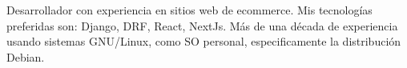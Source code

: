 


\begin{cvpubs}

  \cvpub
    {
      \begin{cvlist}
  \item {Desarrollador con experiencia en sitios web de ecommerce. Mis tecnologías preferidas son: Django, DRF, React, NextJs. Más de una década de experiencia usando sistemas GNU/Linux, como SO personal, especificamente la distribución Debian. }
      \end{cvlist}
    }\vspace{-15pt}
\end{cvpubs}

